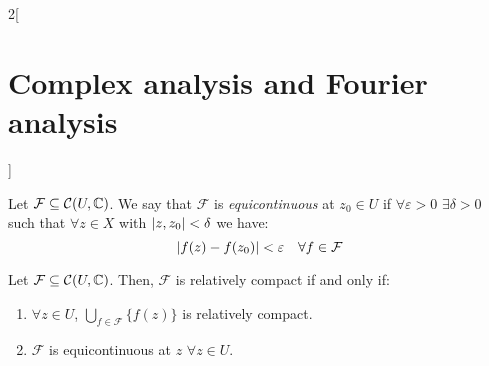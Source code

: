 \documentclass[../../../main.tex]{subfiles}
\begin{document}
\begin{multicols}{2}[\section{Complex analysis and Fourier analysis}]
\begin{definition}
  \end{definition}
  \begin{definition}
    Let $\mathcal{F}\subseteq \mathcal{C}(U,\mathbb{C})$. We say that $\mathcal{F}$ is \emph{equicontinuous} at $z_0\in U$ if $\forall \varepsilon>0$ $\exists \delta>0$ such that $\forall z\in X$ with $\abs{z,z_0}<\delta$ we have: $$\abs{f(z)-f(z_0)}<\varepsilon\quad\forall f\in \mathcal{F}$$
  \end{definition}
  \begin{theorem}
    Let $\mathcal{F}\subseteq \mathcal{C}(U,\mathbb{C})$. Then, $\mathcal{F}$ is relatively compact if and only if:
    \begin{enumerate}
      \item $\forall z\in U$, $\bigcup_{f\in\mathcal{F}}\{f(z)\}$ is relatively compact.
      \item $\mathcal{F}$ is equicontinuous at $z$ $\forall z\in U$.
    \end{enumerate}
  \end{theorem}
\end{multicols}
\end{document}
